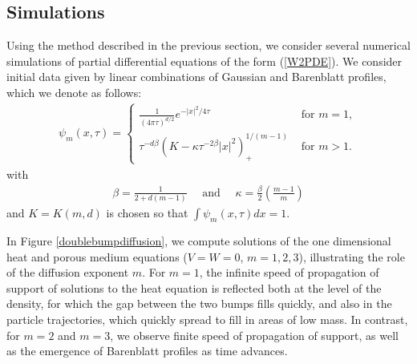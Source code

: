 \documentclass[11pt,leqno]{amsart}
\newtheorem{cor}[thm]{COROLLARY}
\theoremstyle{definition}
\newcommand{\be}{\begin{equation}}
\newcommand{\ee}{\end{equation}}
\newcommand{\comment}[1]{{\color{red}#1}} %
\newcommand{\Rd}{{\mathord{\mathbb R}^d}}
\newcommand{\grad}{\nabla}
\def\epsilon{\varepsilon}
\def\e{\varepsilon}
\begin{document}
%
%


\subsection{Simulations} \label{simulations}
Using the method described in the previous section, we consider several numerical simulations of partial differential equations of the form (\ref{W2PDE}). We consider initial data given by linear combinations of Gaussian and Barenblatt profiles, which we denote as follows:
\begin{align}   \label{barenblatt}
\psi_{m}(x,\tau) = \begin{cases} \frac{1}{(4\pi \tau)^{d/2}} e^{-|x|^2/4 \tau} &\text{ for } m=1, \\
 \tau^{-d\beta}(K - \kappa \tau^{-2\beta} |x|^2)_+^{1/(m-1)} & \text{ for } m>1. \end{cases}
\end{align}
with
\begin{align*}
\beta = \frac{1}{2+d(m-1)} \quad \text{ and } \quad \kappa = \frac{\beta}{2} \left( \frac{m-1}{m} \right) \end{align*}
and $ K = K(m,d)$ is chosen so that $\int \psi_{m}(x,\tau) dx = 1$.

 In Figure \ref{doublebumpdiffusion}, we compute solutions of the one dimensional heat and porous medium equations ($V=W=0$, $m=1,2,3$), illustrating the role of the diffusion exponent $m$. For $m=1$, the infinite speed of propagation of support of solutions to the heat equation is reflected both at the level of the density, for which the gap between the two bumps fills quickly, and also in the particle trajectories, which quickly spread to fill in areas of low mass. In contrast, for $m=2$ and $m=3$, we observe finite speed of propagation of support, as well as the emergence of Barenblatt profiles as time advances.
\end{document}
